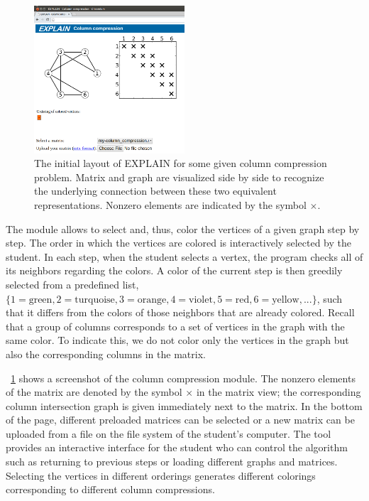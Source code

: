 \documentclass[12pt, oneside]{book}
\begin{document}
\begin{figure}
\centering
\includegraphics[width=0.5\textwidth]{fig1.png}
\caption{The initial layout of EXPLAIN for some given column compression problem. Matrix and graph are visualized side by side to recognize the underlying connection between these two equivalent representations. Nonzero elements are indicated by the symbol $\times$.
}
\label{fig1}
\end{figure}
The module allows to select and, thus, color the vertices of a given graph step by step. The order in which the vertices are colored is interactively selected by the student. In each step, when the student selects a vertex, the program checks all of its neighbors regarding the colors. A color of the current step is then greedily selected from a predefined list, $\{1=\text{green}, 2=\text{turquoise}, 3=\text{orange}, 4=\text{violet}, 5=\text{red}, 6=\text{yellow}, ...\}$, such that it differs from the colors of those neighbors that are already colored. Recall that a group of columns corresponds to a set of vertices in the graph with the same color. To indicate this, we do not color only the vertices in the graph but also the corresponding columns in the matrix.

\figurename~\ref{fig1} shows a screenshot of the column compression module. The nonzero elements of the matrix are denoted by the symbol $\times$ in the matrix view; the corresponding column intersection graph is given immediately next to the matrix. In the bottom of the page, different preloaded matrices can be selected or a new matrix can be uploaded from a file on the file system of the student's computer. The tool provides an interactive interface for the student who can control the algorithm such as returning to previous steps or loading different graphs and matrices. Selecting the vertices in different orderings generates different colorings corresponding to different column compressions.
\end{document}
